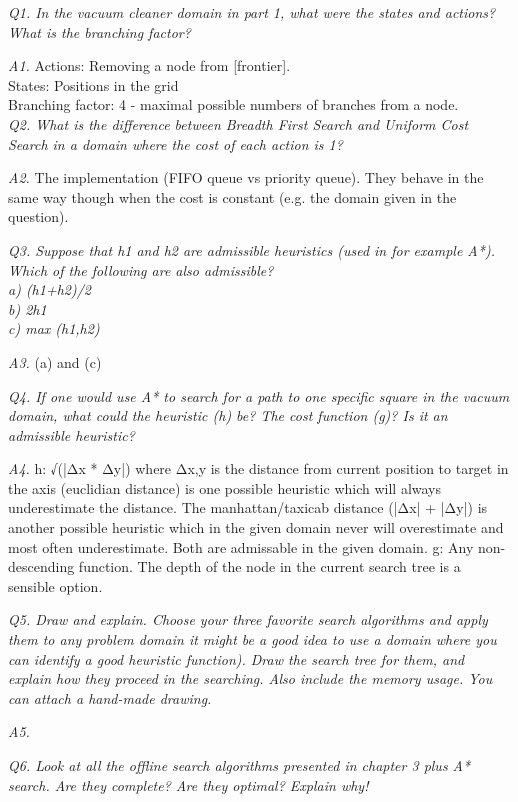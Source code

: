 \em Q1. In the vacuum cleaner domain in part 1, what were the states and actions? What is the branching factor?\em

\emph{A1.} Actions: Removing a node from [frontier].\\
    States: Positions in the grid\\
    Branching factor: 4 - maximal possible numbers of branches from a node.\\

\em Q2. What is the difference between Breadth First Search and Uniform Cost Search in a domain where the cost
    of each action is 1?\em

\emph{A2.} The implementation (FIFO queue vs priority queue). They behave in the same way though when the cost
    is constant (e.g. the domain given in the question).

\em Q3. Suppose that h1 and h2 are admissible heuristics (used in for example A*). Which of the following are
    also admissible?\\
    a) (h1+h2)/2\\
    b) 2h1\\
    c) max (h1,h2)\em

\emph{A3.} (a) and (c)

\em Q4. If one would use A* to search for a path to one specific square in the vacuum domain, what could the
    heuristic (h) be? The cost function (g)? Is it an admissible heuristic?\em

\emph{A4.} h: √(|Δx * Δy|) where Δ{x,y} is the distance from current position to target in the axis (euclidian
    distance) is one possible heuristic which will always underestimate the distance. The manhattan/taxicab
    distance (|Δx| + |Δy|) is another possible heuristic which in the given domain never will overestimate
    and most often underestimate. Both are admissable in the given domain.
    g: Any non-descending function. The depth of the node in the current search tree is a sensible option.

\em Q5. Draw and explain. Choose your three favorite search algorithms and apply them to any problem domain
    it might be a good idea to use a domain where you can identify a good heuristic function). Draw the
    search tree for them, and explain how they proceed in the searching. Also include the memory usage.
    You can attach a hand-made drawing.\em

\emph{A5.}

\em Q6. Look at all the offline search algorithms presented in chapter 3 plus A* search. Are they complete?
Are they optimal? Explain why!\em

